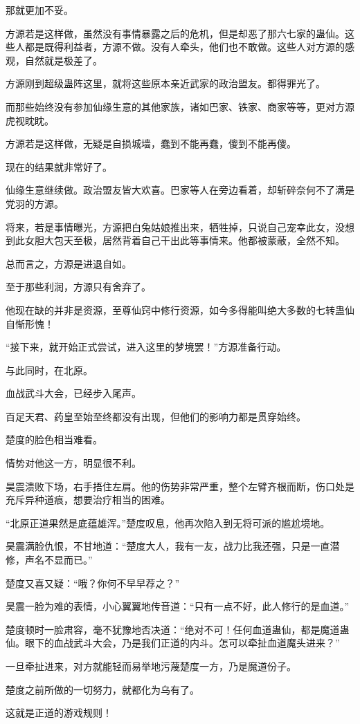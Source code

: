 \begin{this_body}
那就更加不妥。

方源若是这样做，虽然没有事情暴露之后的危机，但是却恶了那六七家的蛊仙。这些人都是既得利益者，方源不做。没有人牵头，他们也不敢做。这些人对方源的感观，自然就是极差了。

方源刚到超级蛊阵这里，就将这些原本亲近武家的政治盟友。都得罪光了。

而那些始终没有参加仙缘生意的其他家族，诸如巴家、铁家、商家等等，更对方源虎视眈眈。

方源若是这样做，无疑是自损城墙，蠢到不能再蠢，傻到不能再傻。

现在的结果就非常好了。

仙缘生意继续做。政治盟友皆大欢喜。巴家等人在旁边看着，却斩碎奈何不了满是党羽的方源。

将来，若是事情曝光，方源把白兔姑娘推出来，牺牲掉，只说自己宠幸此女，没想到此女胆大包天至极，居然背着自己干出此等事情来。他都被蒙蔽，全然不知。

总而言之，方源是进退自如。

至于那些利润，方源只有舍弃了。

他现在缺的并非是资源，至尊仙窍中修行资源，如今多得能叫绝大多数的七转蛊仙自惭形愧！

“接下来，就开始正式尝试，进入这里的梦境罢！”方源准备行动。

与此同时，在北原。

血战武斗大会，已经步入尾声。

百足天君、药皇至始至终都没有出现，但他们的影响力都是贯穿始终。

楚度的脸色相当难看。

情势对他这一方，明显很不利。

昊震溃败下场，右手捂住左肩。他的伤势非常严重，整个左臂齐根而断，伤口处是充斥异种道痕，想要治疗相当的困难。

“北原正道果然是底蕴雄浑。”楚度叹息，他再次陷入到无将可派的尴尬境地。

昊震满脸仇恨，不甘地道：“楚度大人，我有一友，战力比我还强，只是一直潜修，声名不显而已。”

楚度又喜又疑：“哦？你何不早早荐之？”

昊震一脸为难的表情，小心翼翼地传音道：“只有一点不好，此人修行的是血道。”

楚度顿时一脸肃容，毫不犹豫地否决道：“绝对不可！任何血道蛊仙，都是魔道蛊仙。眼下的血战武斗大会，乃是我们正道的内斗。怎可以牵扯血道魔头进来？”

一旦牵扯进来，对方就能轻而易举地污蔑楚度一方，乃是魔道份子。

楚度之前所做的一切努力，就都化为乌有了。

这就是正道的游戏规则！

\end{this_body}

